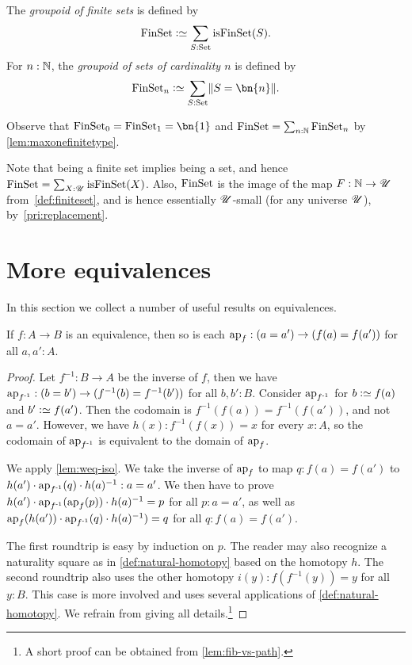 \begin{definition}\label{def:groupoidFin}
The \emph{groupoid of finite sets} is defined by
\[
  \FinSet\defeq\sum_{S:\Set}\isfinset(S).
\]
For $n:\mathbb{N}$, the \emph{groupoid of sets of cardinality $n$} is defined by
\[
  \FinSet_n\defequi \sum_{S:\Set}\Trunc{S=\bn{n}}.\qedhere
\]
\end{definition}
Observe that $\FinSet_0=\FinSet_1=\bn{1} $ and $\mathrm{FinSet}=\sum_{n:\mathbb{N}}\mathrm{FinSet}_n$
by \cref{lem:maxonefinitetype}.

Note that being a finite set implies being a set, and hence
$\FinSet = \sum_{X:\UU}\isfinset(X)$.
Also, $\mathrm{FinSet}$ is the image of the map $F : \mathbb{N} \to {\mathscr{U}}$
from~\cref{def:finiteset}, and is hence essentially ${\mathscr{U}}$-small
(for any universe ${\mathscr{U}}$), by~\cref{pri:replacement}.

\section{More equivalences}
\label{sec:more-on-equivalences}

In this section we collect a number of useful results on equivalences.

\begin{lemma}\label{lem:ap-equivalence}
If $f:A\to B$ is an equivalence, then so is each 
$\ap{f}: (a=a') \to (f(a)=f(a'))$ for all $a,a':A$.
\end{lemma}
\begin{proof}
Let $f^{-1} : B\to A$ be the inverse of $f$, then we have 
$\ap{f^{-1}}: (b=b') \to (f^{-1}(b)=f^{-1}(b'))$ for all $b,b':B$.
Consider $\ap{f^{-1}}$ for $b\defeq f(a)$ and $b'\defeq f(a')$.
Then the codomain is $f^{-1}(f(a))=f^{-1}(f(a'))$, and not $a=a'$.
However, we have $h(x):f^{-1}(f(x))=x$ for every $x:A$, so the 
codomain of $\ap{f^{-1}}$ is equivalent to the domain of $\ap{f}$.

We apply \cref{lem:weq-iso}.
We take the inverse of $\ap{f}$ to map $q: f(a)=f(a')$
to $h(a')\cdot{\ap{f^{-1}}(q)}\cdot {h(a)^{-1}} : a=a'$.
We then have to prove $h(a')\cdot{\ap{f^{-1}}(\ap{f}(p))}\cdot {h(a)^{-1}} = p$
for all $p: a=a'$, as well as 
$\ap{f}(h(a'))\cdot\ap{f^{-1}}(q)\cdot {h(a)^{-1}})=q$ for all $q: f(a)=f(a')$.

The first roundtrip is easy by induction on $p$. The reader may also recognize a 
naturality square as in \cref{def:natural-homotopy} based on the homotopy $h$.
The second roundtrip also uses the other homotopy $i(y):f(f^{-1}(y))=y$ for all $y:B$.
This case is more involved and uses several applications of \cref{def:natural-homotopy}.
We refrain from giving all details.\footnote{%
A short proof can be obtained from \cref{lem:fib-vs-path}.}
\end{proof}

